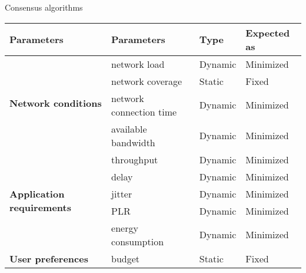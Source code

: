 

Consensus algorithms

\begin{table}[h!]
	\begin{tabular}{l|l|l|l}
	\textbf{Parameters}                                & \textbf{Parameters}     & \textbf{Type} & \textbf{Expected as}  \\\hline
	\multirow{4}{*}{\textbf{Network conditions}}       & network load            & Dynamic       & Minimized  \\
	\                                                  & network coverage        & Static        & Fixed      \\
	\                                                  & network connection time & Dynamic       & Minimized  \\
	\                                                  & available bandwidth     & Dynamic       & Minimized  \\\hline
	\multirow{5}{*}{\textbf{Application requirements}} & throughput              & Dynamic       & Minimized  \\
	\                                                  & delay                   & Dynamic       & Minimized  \\
	\                                                  & jitter                  & Dynamic       & Minimized  \\
	\                                                  & PLR                     & Dynamic       & Minimized  \\
	\                                                  & energy consumption      & Dynamic       & Minimized  \\\hline
	\multirow{2}{*}{\textbf{User preferences}}         & budget                  & Static        & Fixed      \\

\end{tabular}
\end{table}

